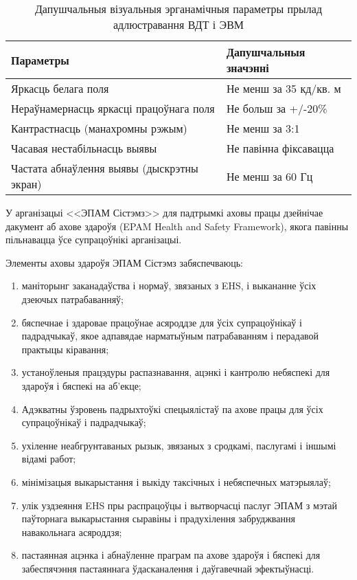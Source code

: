 \begin{table}[htp]
    \caption{Дапушчальныя візуальныя эрганамічныя параметры прылад
    адлюстравання ВДТ і ЭВМ}
    \begin{tabularx}{\textwidth}{ | >{\centering\arraybackslash}X
                                  | >{\centering\arraybackslash}X | }
    \hline
        Параметры & Дапушчальныя значэнні \\
    \hline
        Яркасць белага поля & Не менш за 35 кд/кв. м \\
    \hline
        Нераўнамернасць яркасці працоўнага поля & Не больш за +/-20\% \\
    \hline
         Кантрастнасць (манахромны рэжым) & Не менш за 3:1 \\
    \hline
        Часавая нестабільнасць выявы & Не павінна фіксавацца \\
    \hline
        Частата абнаўлення выявы (дыскрэтны экран) & Не менш за 60 Гц \\
    \hline
    \end{tabularx}
    \label{table: healthy4}
\end{table}

У арганізацыі <<ЭПАМ Сістэмз>> для падтрымкі аховы працы дзейнічае
дакумент аб ахове здароўя (EPAM Health and Safety Framework), якога павінны пільнавацца
ўсе супрацоўнікі арганізацыі.

Элементы аховы здароўя ЭПАМ Сістэмз забяспечваюць:
\begin{enumerate}
    \item маніторынг заканадаўства і нормаў, звязаных з EHS, і выкананне ўсіх дзеючых патрабаванняў;
    \item бяспечнае і здаровае працоўнае асяроддзе для ўсіх супрацоўнікаў і падрадчыкаў, якое адпавядае нарматыўным патрабаванням і перадавой практыцы кіравання;
    \item устаноўленыя працэдуры распазнавання, ацэнкі і кантролю небяспекі для здароўя і бяспекі на аб'екце;
    \item Адэкватны ўзровень падрыхтоўкі спецыялістаў па ахове працы для ўсіх супрацоўнікаў і падрадчыкаў;
    \item ухіленне неабгрунтаваных рызык, звязаных з сродкамі, паслугамі і іншымі відамі работ;
    \item мінімізацыя выкарыстання і выкіду таксічных і небяспечных матэрыялаў;
    \item улік уздзеяння EHS пры распрацоўцы і вытворчасці паслуг ЭПАМ з мэтай паўторнага выкарыстання сыравіны і прадухілення забруджвання навакольнага асяроддзя;
    \item пастаянная ацэнка і абнаўленне праграм па ахове здароўя і бяспекі для забеспячэння пастаяннага ўдасканалення і даўгавечнай эфектыўнасці.
\end{enumerate}

